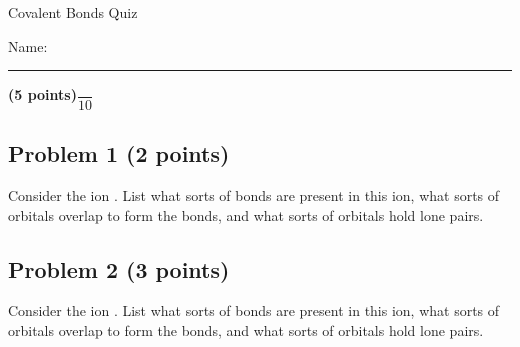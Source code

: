 \documentclass[12pt, letterpaper]{memoir}
\begin{document}
	\begin{center}
		{\large Covalent Bonds Quiz}
	\end{center}
	{\large Name: \rule[-1mm]{4in}{.1pt} {\bfseries (5 points)}\hspace{4em}$\dfrac{~}{10}$} 
	
	\subsection*{Problem 1 (2 points)}
	Consider the ion . List what sorts of bonds are present in this ion, what sorts of orbitals overlap to form the bonds, and what sorts of orbitals hold lone pairs.
	
	\vspace{18em}
	\subsection*{Problem 2 (3 points)}
	Consider the ion . List what sorts of bonds are present in this ion, what sorts of orbitals overlap to form the bonds, and what sorts of orbitals hold lone pairs.
\end{document}
